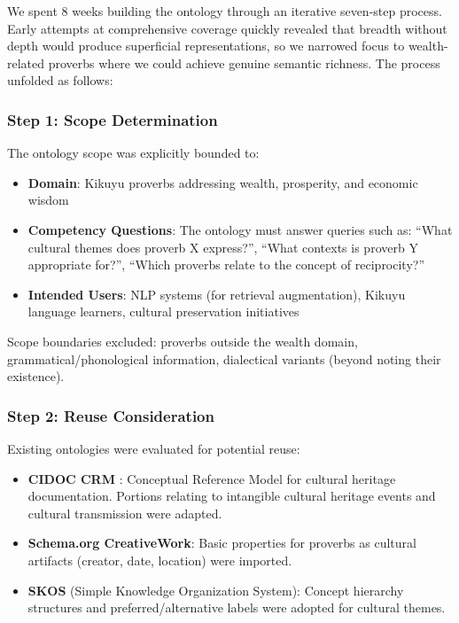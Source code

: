 We spent 8 weeks building the ontology through an iterative seven-step process. Early attempts at comprehensive coverage quickly revealed that breadth without depth would produce superficial representations, so we narrowed focus to wealth-related proverbs where we could achieve genuine semantic richness. The process unfolded as follows:

\subsubsection{Step 1: Scope Determination}
\label{subsubsec:scope_determination}

The ontology scope was explicitly bounded to:
\begin{itemize}
    \item \textbf{Domain}: Kikuyu proverbs addressing wealth, prosperity, and economic wisdom
    \item \textbf{Competency Questions}: The ontology must answer queries such as: ``What cultural themes does proverb X express?'', ``What contexts is proverb Y appropriate for?'', ``Which proverbs relate to the concept of reciprocity?''
    \item \textbf{Intended Users}: NLP systems (for retrieval augmentation), Kikuyu language learners, cultural preservation initiatives
\end{itemize}

Scope boundaries excluded: proverbs outside the wealth domain, grammatical/phonological information, dialectical variants (beyond noting their existence).

\subsubsection{Step 2: Reuse Consideration}
\label{subsubsec:ontology_reuse}

Existing ontologies were evaluated for potential reuse:

\begin{itemize}
    \item \textbf{CIDOC CRM} \cite{doerr2003cidoc}: Conceptual Reference Model for cultural heritage documentation. Portions relating to intangible cultural heritage events and cultural transmission were adapted.
    
    \item \textbf{Schema.org CreativeWork}: Basic properties for proverbs as cultural artifacts (creator, date, location) were imported.
    
    \item \textbf{SKOS} (Simple Knowledge Organization System): Concept hierarchy structures and preferred/alternative labels were adopted for cultural themes.
\end{itemize}

